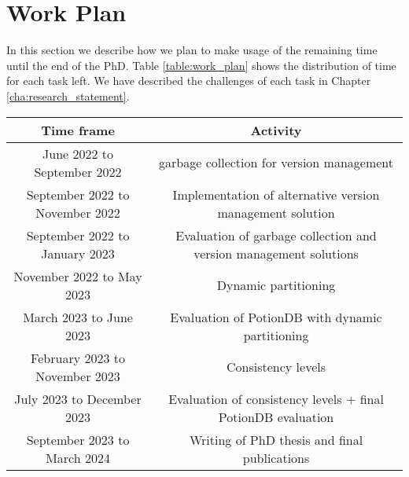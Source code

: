 
%

\chapter{Work Plan}
\label{cha:work_plan}



In this section we describe how we plan to make usage of the remaining time until the end of the PhD.
Table \ref{table:work_plan} shows the distribution of time for each task left.
We have described the challenges of each task in Chapter \ref{cha:research_statement}.


\begin{center}
	\begin{tabular}{c | c}
		\hline
		Time frame & Activity \\
		\hline
		June 2022 to September 2022 & garbage collection for version management \\
		September 2022 to November 2022 & 
		Implementation of alternative version management solution \\
		September 2022 to January 2023 & Evaluation of garbage collection and version management solutions \\
		November 2022 to May 2023 & Dynamic partitioning \\
		March 2023 to June 2023 & Evaluation of PotionDB with dynamic partitioning \\
		February 2023 to November 2023 & Consistency levels \\
		July 2023 to December 2023 & Evaluation of consistency levels + final PotionDB evaluation \\
		September 2023 to March 2024 & Writing of PhD thesis and final publications \\
		\hline
	\end{tabular}
	\label{table:work_plan}
\end{center}

